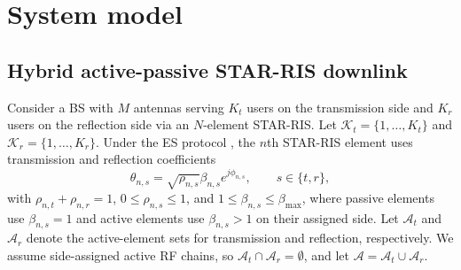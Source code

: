 \documentclass[journal]{IEEEtran}
\begin{document}
\section{System model}
\subsection{Hybrid active-passive STAR-RIS downlink}
Consider a BS with $M$ antennas serving $K_t$ users on the transmission side and $K_r$ users on the reflection side via an $N$-element STAR-RIS. Let $\mathcal{K}_t=\{1,\ldots,K_t\}$ and $\mathcal{K}_r=\{1,\ldots,K_r\}$. Under the ES protocol \cite{mu2022star}, the $n$th STAR-RIS element uses transmission and reflection coefficients
\begin{equation}
\theta_{n,s}=\sqrt{\rho_{n,s}}\beta_{n,s}e^{j\phi_{n,s}},\qquad s\in\{t,r\},
\label{eq:theta}
\end{equation}
with $\rho_{n,t}+\rho_{n,r}=1$, $0\le \rho_{n,s}\le 1$, and $1\le \beta_{n,s}\le \beta_{\max}$, where passive elements use $\beta_{n,s}=1$ and active elements use $\beta_{n,s}>1$ on their assigned side. Let $\mathcal{A}_t$ and $\mathcal{A}_r$ denote the active-element sets for transmission and reflection, respectively. We assume side-assigned active RF chains, so $\mathcal{A}_t\cap\mathcal{A}_r=\emptyset$, and let $\mathcal{A}=\mathcal{A}_t\cup\mathcal{A}_r$.
\end{document}

